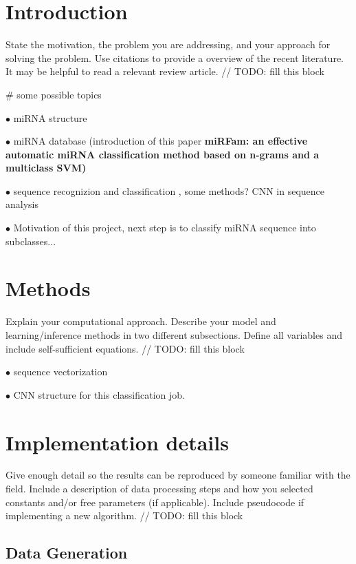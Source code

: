 \documentclass[letterpaper, 11pt]{article}
\begin{document}
\begin{multicols*}{2}
\section{Introduction}
{
State the motivation, the problem you are addressing, and your approach for solving the problem. Use citations to provide a overview of the recent literature. It may be helpful to read a relevant review article.
\newline 
// TODO: fill this block

\# some possible topics

$\bullet$ miRNA structure

$\bullet$ miRNA database (introduction of this paper \textbf{miRFam: an effective automatic miRNA classification method based on n-grams and a multiclass SVM)}

$\bullet$ sequence recognizion and classification , some methods? CNN in sequence analysis

$\bullet$ Motivation of this project, next step is to classify miRNA sequence into subclasses...

}
\section{Methods}
{
Explain your computational approach. Describe your model and learning/inference methods in two different subsections. Define all variables and include self-sufficient equations.
\newline 
// TODO: fill this block

$\bullet$ sequence vectorization

$\bullet$ CNN structure for this classification job.

}

\section{Implementation details}
{
Give enough detail so the results can be reproduced by someone familiar with the field. Include a description of data processing steps and how you selected constants and/or free parameters (if applicable). Include pseudocode if implementing a new algorithm.
\newline
// TODO: fill this block
\subsection{Data Generation}

}
\end{multicols*}
\end{document}
